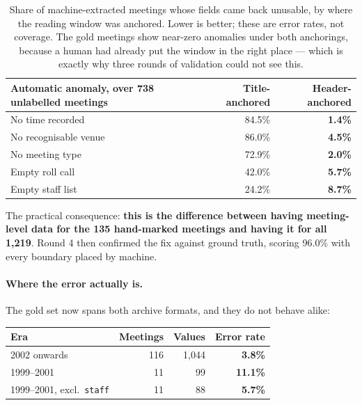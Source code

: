 \documentclass[11pt]{article}
\begin{document}
\begin{table}[h]
\centering
\begin{tabular}{lrr}
\toprule
Automatic anomaly, over 738 unlabelled meetings & Title-anchored & Header-anchored \\
\midrule
No time recorded              & 84.5\% & \textbf{1.4\%} \\
No recognisable venue         & 86.0\% & \textbf{4.5\%} \\
No meeting type               & 72.9\% & \textbf{2.0\%} \\
Empty roll call               & 42.0\% & \textbf{5.7\%} \\
Empty staff list              & 24.2\% & \textbf{8.7\%} \\
\bottomrule
\end{tabular}
\caption{Share of machine-extracted meetings whose fields came back unusable, by where the
reading window was anchored. Lower is better; these are error rates, not coverage. The gold
meetings show near-zero anomalies under both anchorings, because a human had already put the
window in the right place --- which is exactly why three rounds of validation could not see
this.}
\label{tab:anchor}
\end{table}

\noindent
The practical consequence: \textbf{this is the difference between having meeting-level data
for the 135 hand-marked meetings and having it for all 1{,}219}. Round 4 then confirmed the
fix against ground truth, scoring 96.0\% with every boundary placed by machine.

\paragraph{Where the error actually is.} The gold set now spans both archive formats, and
they do not behave alike:

\begin{center}
\begin{tabular}{lrrr}
\toprule
Era & Meetings & Values & Error rate \\
\midrule
2002 onwards            & 116 & 1{,}044 & \textbf{3.8\%} \\
1999--2001              &  11 &     99 & \textbf{11.1\%} \\
1999--2001, excl.\ \texttt{staff} & 11 & 88 & \textbf{5.7\%} \\
\bottomrule
\end{tabular}
\end{center}
\end{document}
